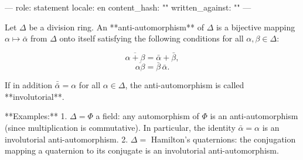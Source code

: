 ---
role: statement
locale: en
content_hash: ""
written_against: ""
---

Let $\Delta$ be a division ring. An **anti-automorphism** of $\Delta$ is a bijective mapping $\alpha \mapsto \bar{\alpha}$ from $\Delta$ onto itself satisfying the following conditions for all $\alpha, \beta \in \Delta$:

$$\overline{\alpha + \beta} = \bar{\alpha} + \bar{\beta},$$
$$\overline{\alpha \beta} = \bar{\beta}\, \bar{\alpha}.$$

If in addition $\bar{\bar{\alpha}} = \alpha$ for all $\alpha \in \Delta$, the anti-automorphism is called **involutorial**.

**Examples:**
1. $\Delta = \Phi$ a field: any automorphism of $\Phi$ is an anti-automorphism (since multiplication is commutative). In particular, the identity $\bar{\alpha} = \alpha$ is an involutorial anti-automorphism.
2. $\Delta = $ Hamilton's quaternions: the conjugation mapping a quaternion to its conjugate is an involutorial anti-automorphism.
